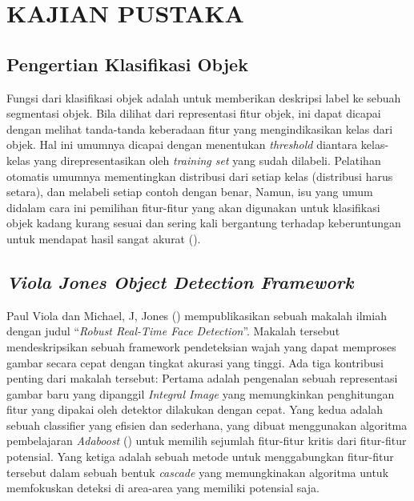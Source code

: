 
\chapter{KAJIAN PUSTAKA}

\section{Pengertian Klasifikasi Objek}

Fungsi dari klasifikasi objek adalah untuk memberikan deskripsi label ke 
sebuah segmentasi objek. Bila dilihat dari representasi fitur objek, ini 
dapat dicapai dengan melihat tanda-tanda keberadaan fitur yang mengindikasikan 
kelas dari objek. Hal ini umumnya dicapai dengan menentukan \textit{threshold} diantara 
kelas-kelas yang direpresentasikan oleh \textit{training set} yang sudah dilabeli. 
 Pelatihan otomatis umumnya mementingkan distribusi dari 
setiap kelas (distribusi harus setara), dan melabeli setiap contoh dengan benar, 
Namun, isu yang umum didalam cara ini pemilihan fitur-fitur yang akan digunakan untuk 
klasifikasi objek kadang kurang sesuai dan sering kali bergantung terhadap 
keberuntungan untuk mendapat hasil sangat akurat (\cite{rennoetal}).

\section{\emph{Viola Jones Object Detection Framework}}

Paul Viola dan Michael, J, Jones (\cite{rennoetal}) mempublikasikan sebuah makalah ilmiah dengan 
judul “\emph{Robust Real-Time Face Detection}”. Makalah tersebut mendeskripsikan sebuah 
framework pendeteksian wajah yang dapat memproses gambar secara cepat dengan 
tingkat akurasi yang tinggi. Ada tiga kontribusi penting dari makalah tersebut: 
Pertama adalah pengenalan sebuah representasi gambar baru yang dipanggil 
\emph{Integral Image} yang memungkinkan penghitungan fitur yang dipakai oleh detektor 
dilakukan dengan cepat. Yang kedua adalah sebuah classifier yang efisien dan 
sederhana, yang dibuat menggunakan algoritma pembelajaran \emph{Adaboost} 
(\cite{freundetal}) untuk memilih sejumlah fitur-fitur kritis dari 
fitur-fitur potensial. Yang ketiga adalah sebuah metode untuk menggabungkan 
fitur-fitur tersebut dalam sebuah bentuk \emph{cascade} yang memungkinakan algoritma 
untuk memfokuskan deteksi di area-area yang memiliki potensial saja.


